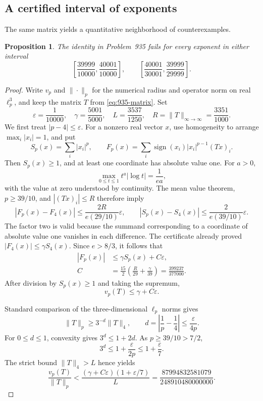 \documentclass[11pt,a4paper]{article}
\newtheorem{proposition}[theorem]{Proposition}
\theoremstyle{remark}
\begin{document}
\subsection{A certified interval of exponents}
\label{sec:935-robustness}

The same matrix yields a quantitative neighborhood of counterexamples.
\begin{proposition}\label{prop:935-interval}
The identity in Problem~935 fails for every exponent in either interval
\[
 \left[\frac{39999}{10000},\frac{40001}{10000}\right],
 \qquad
 \left[\frac{40001}{30001},\frac{39999}{29999}\right].
\]
\end{proposition}
\begin{proof}
Write $v_p$ and $\|\cdot\|_p$ for the numerical radius and operator norm on
real $\ell_p^3$, and keep the matrix $T$ from \eqref{eq:935-matrix}. Set
\[
 \varepsilon=\frac1{10000},\quad
 \gamma=\frac{5001}{5000},\quad L=\frac{3537}{1250},\quad
 R=\|T\|_{\infty\to\infty}=\frac{3351}{1000}.
\]
We first treat $|p-4|\le\varepsilon$. For a nonzero real vector $x$, use
homogeneity to arrange $\max_i|x_i|=1$, and put
\[
 S_p(x)=\sum_i|x_i|^p,\qquad
 F_p(x)=\sum_i\operatorname{sign}(x_i)|x_i|^{p-1}(Tx)_i.
\]
Then $S_p(x)\ge1$, and at least one coordinate has absolute value one.
For $a>0$,
\[
 \max_{0\le t\le1}t^a|\log t|=\frac1{ea},
\]
with the value at zero understood by continuity. The mean value theorem,
$p\ge39/10$, and $|(Tx)_i|\le R$ therefore imply
\[
 |F_p(x)-F_4(x)|
 \le\frac{2R}{e(29/10)}\varepsilon,
 \qquad
 |S_p(x)-S_4(x)|
 \le\frac{2}{e(39/10)}\varepsilon.
 \tag{935.12}\label{eq:935-pvariation}
\]
The factor two is valid because the summand corresponding to a coordinate
of absolute value one vanishes in each difference. The certificate already
proved $|F_4(x)|\le\gamma S_4(x)$. Since $e>8/3$, it follows that
\[
 \begin{split}
 |F_p(x)|
 &\le\gamma S_p(x)+C\varepsilon,\\
 C&=\frac{15}{2}\left(\frac{R}{29}+\frac{\gamma}{39}\right)
   =\frac{399237}{377000}.
 \end{split}
\]
After division by $S_p(x)\ge1$ and taking the supremum,
\[
 v_p(T)\le\gamma+C\varepsilon.
 \tag{935.13}\label{eq:935-vp}
\]

Standard comparison of the three-dimensional $\ell_p$ norms gives
\[
 \|T\|_p\ge3^{-d}\|T\|_4,
 \qquad d=\left|\frac1p-\frac14\right|
          \le\frac{\varepsilon}{4p}.
\]
For $0\le d\le1$, convexity gives $3^d\le1+2d$. As $p\ge39/10>7/2$,
\[
 3^d\le1+\frac{\varepsilon}{2p}
       \le1+\frac{\varepsilon}{7}.
\]
The strict bound $\|T\|_4>L$ hence yields
\[
 \frac{v_p(T)}{\|T\|_p}
 <\frac{(\gamma+C\varepsilon)(1+\varepsilon/7)}{L}
 =\frac{87994832581079}{248910480000000}.
 \tag{935.14}\label{eq:935-rp}
\]


\end{proof}
\end{document}
